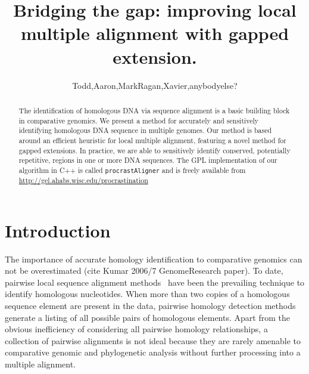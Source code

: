 \documentclass{llncs}
\begin{document}
\renewcommand{\labelenumi}{(\Alph{enumi})}
\renewcommand{\labelenumii}{(\alph{enumii})}

\frontmatter          %
%
\pagestyle{headings}  %

\mainmatter              %
%
\title{Bridging the gap: improving local multiple alignment with gapped extension.}
%
\author{Todd,Aaron,MarkRagan,Xavier,anybodyelse?}

%

\maketitle


\begin{abstract}
The identification of homologous DNA via sequence alignment is a basic building block in comparative genomics.  We present a method for accurately and sensitively identifying homologous DNA sequence in multiple genomes. Our method is based around an efficient heuristic for local multiple alignment, featuring a novel method for gapped extensions. In practice, we are able to sensitively identify conserved, potentially repetitive, regions in one or more DNA sequences.  The GPL implementation of our algorithm in C++ is
called \texttt{procrastAligner} and is freely available from
\url{http://gel.ahabs.wisc.edu/procrastination}
\end{abstract}




\section{ Introduction }

The importance of accurate homology identification to comparative genomics can not be overestimated (cite Kumar 2006/7 GenomeResearch paper). To date, pairwise local sequence alignment methods~\cite{blast,ssearch...} have been the prevailing technique to identify homologous nucleotides.  When more than two copies of a homologous sequence element are present in the data, pairwise homology detection methods generate a listing of all possible pairs of homologous elements.  Apart from the obvious inefficiency of considering all pairwise homology relationships, a collection of pairwise alignments is not ideal because they are rarely amenable to comparative genomic and phylogenetic analysis without further processing into a multiple alignment.
\end{document}
